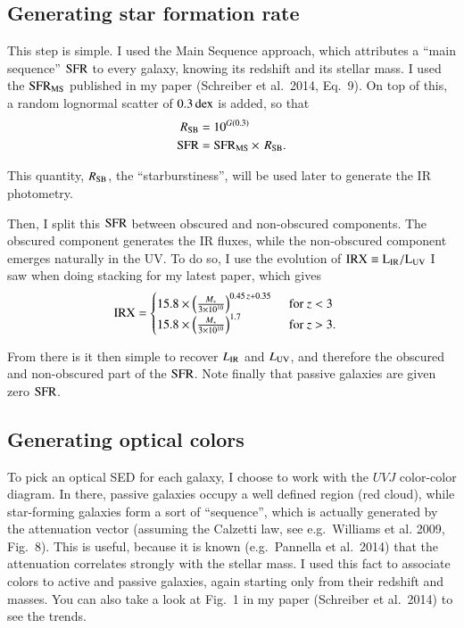 \documentclass[12pt,a4paper]{article}
\newcommand{\sfr}{{\rm SFR}}
\newcommand{\lir}{L_{\rm IR}}
\newcommand{\irx}{\rm IRX}
\newcommand{\luv}{L_{\rm UV}}
\newcommand{\dex}{{\rm dex}}
\newcommand{\mstar}{M_\ast}
\newcommand{\rsb}{R_{\rm SB}}
\newcommand{\uvj}{$UVJ$\xspace}
\begin{document}
\subsection{Generating star formation rate \label{SEC:sfr}}

This step is simple. I used the Main Sequence approach, which attributes a ``main sequence'' $\sfr$ to every galaxy, knowing its redshift and its stellar mass. I used the $\sfr_{\rm MS}$ published in my paper (Schreiber et al.~2014, Eq.~9). On top of this, a random lognormal scatter of $0.3\,\dex$ is added, so that
\begin{align}
\rsb &= 10^{G(0.3)} \\
\sfr &= \sfr_{\rm MS} \times \, \rsb.
\end{align}

This quantity, $\rsb$, the ``starburstiness'', will be used later to generate the IR photometry.

Then, I split this $\sfr$ between obscured and non-obscured components. The obscured component generates the IR fluxes, while the non-obscured component emerges naturally in the UV. To do so, I use the evolution of $\irx \equiv \lir/\luv$ I saw when doing stacking for my latest paper, which gives
\begin{align}
\irx &= \begin{cases}
15.8 \times \left(\frac{\mstar}{3 \times 10^{10}}\right)^{0.45\, z + 0.35}\,\
&\text{for $z<3$} \\
15.8 \times \left(\frac{\mstar}{3 \times 10^{10}}\right)^{1.7}\,&\text{for $z>3$.}
\end{cases}
\end{align}

From there is it then simple to recover $\lir$ and $\luv$, and therefore the obscured and non-obscured part of the $\sfr$. Note finally that passive galaxies are given zero $\sfr$.


\subsection{Generating optical colors}

To pick an optical SED for each galaxy, I choose to work with the \uvj color-color diagram. In there, passive galaxies occupy a well defined region (red cloud), while star-forming galaxies form a sort of ``sequence'', which is actually generated by the attenuation vector (assuming the Calzetti law, see e.g.~Williams et al. 2009, Fig.~8). This is useful, because it is known (e.g.~Pannella et al.~2014) that the attenuation correlates strongly with the stellar mass. I used this fact to associate colors to active and passive galaxies, again starting only from their redshift and masses. You can also take a look at Fig.~1 in my paper (Schreiber et al.~2014) to see the trends.
\end{document}
